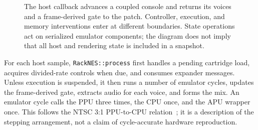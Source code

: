 \documentclass[10pt,letterpaper,twocolumn]{article}
\newcommand{\code}[1]{\texttt{#1}}
\begin{document}
\begin{figure}[t]
\centering
{}
\caption{The host callback advances a coupled console and returns its voices
and a frame-derived gate to the patch. Controller, execution, and memory
interventions enter at different boundaries. State operations act on serialized
emulator components; the diagram does not imply that all host and rendering
state is included in a snapshot.}
\label{fig:architecture}
\end{figure}

For each host sample, \code{RackNES::process} first handles a pending cartridge
load, acquires divided-rate controls when due, and consumes expander messages.
Unless execution is suspended, it then runs a number of emulator cycles,
updates the frame-derived gate, extracts audio for each voice, and forms the
mix. An emulator cycle calls the PPU three times, the CPU once, and the APU
wrapper once. This follows the NTSC 3:1 PPU-to-CPU relation~\cite{nesclock};
it is a description of the stepping arrangement, not a claim of cycle-accurate
hardware reproduction.
\end{document}
